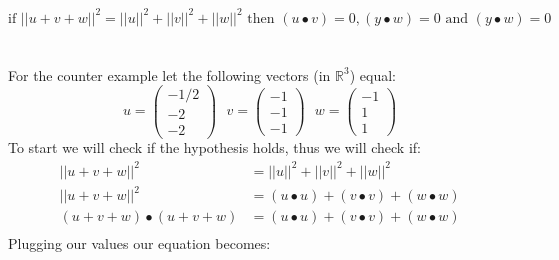 \documentclass[11pt]{article}
\begin{document}
\[ \text{if } ||u + v + w||^2 = ||u||^2 + ||v||^2 + ||w||^2 \text{ then } (u \bullet v) = 0, (y \bullet w) = 0 \text{ and } (y \bullet w) = 0 \]\\\\
 For the counter example let the following vectors (in $\mathbb{R}^3$) equal:
\begin{equation*}
u = 
\begin{pmatrix}
-1/2 \\
-2\\
-2
\end{pmatrix}
\text{  }v =
\begin{pmatrix}
-1 \\
-1\\
-1
\end{pmatrix}
\text{  } w =
\begin{pmatrix}
-1 \\
1\\
1
\end{pmatrix}
\end{equation*}
To start we will check if the hypothesis holds, thus we will check if:
\begin{align*}
||u+v +w||^2   &= ||u||^2 + ||v||^2 + ||w||^2 \\
||u+v +w||^2 &=  (u \bullet u) + (v \bullet v) + (w \bullet w)\\
(u+v+w) \bullet (u+v +w) &=  (u \bullet u) + (v \bullet v) + (w \bullet w)\\
\end{align*}
Plugging our values our equation becomes:
\end{document}
